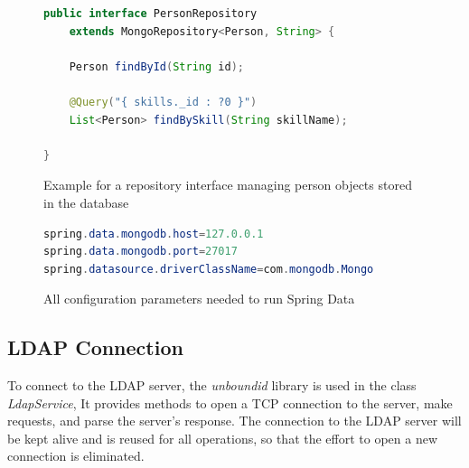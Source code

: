 \begin{figure}
\begin{lstlisting}[language=Java]
public interface PersonRepository
    extends MongoRepository<Person, String> {

	Person findById(String id);

	@Query("{ skills._id : ?0 }")
	List<Person> findBySkill(String skillName);

}
\end{lstlisting}
\caption[Example Repository Interface]{Example for a repository interface managing person objects stored in the database}
\end{figure}

\begin{figure}
\begin{lstlisting}[language=Java]
spring.data.mongodb.host=127.0.0.1
spring.data.mongodb.port=27017
spring.datasource.driverClassName=com.mongodb.Mongo
\end{lstlisting}
\caption[Spring Data Config]{All configuration parameters needed to run Spring Data}
\end{figure}

\subsection{LDAP Connection}
To connect to the LDAP server, the \textit{unboundid} library is used in the class \textit{LdapService}, It provides methods to open a TCP connection to the server, make requests, and parse the server's response. The connection to the LDAP server will be kept alive and is reused for all operations, so that the effort to open a new connection is eliminated.


